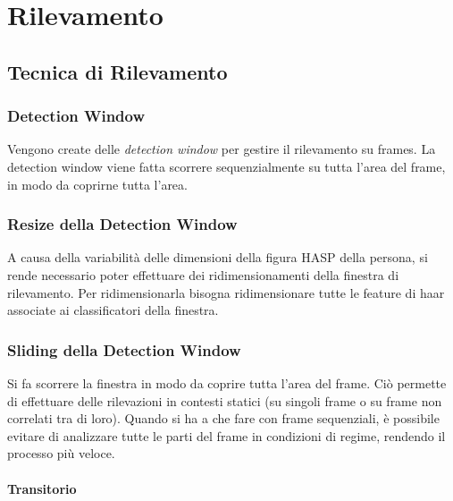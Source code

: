 
\chapter{Rilevamento}
\label{chap:rilevamento}
    \section{Tecnica di Rilevamento}
    \label{sec:detection_tecnique}
        \subsection{Detection Window} %
        \label{sub:detection_window}
            Vengono create delle \emph{detection window} per gestire il rilevamento su frames.
            La detection window viene fatta scorrere sequenzialmente su tutta l'area del frame, in modo da coprirne tutta l'area.
        
        \subsection{Resize della Detection Window} %
        \label{sub:resize_della_detection_window}
            A causa della variabilità delle dimensioni della figura HASP della persona, si rende necessario poter effettuare dei ridimensionamenti della finestra di rilevamento. 
            Per ridimensionarla bisogna ridimensionare tutte le feature di haar associate ai classificatori della finestra.

        \subsection{Sliding della Detection Window} %
        \label{sub:sliding_della_detection_window}
            Si fa scorrere la finestra in modo da coprire tutta l'area del frame.
            Ciò permette di effettuare delle rilevazioni in contesti statici (su singoli frame o su frame non correlati tra di loro).
            Quando si ha a che fare con frame sequenziali, è possibile evitare di analizzare tutte le parti del frame in condizioni di regime, rendendo il processo più veloce.

     
            \subsubsection{Transitorio} %
            \label{ssub:transitorio}
            
